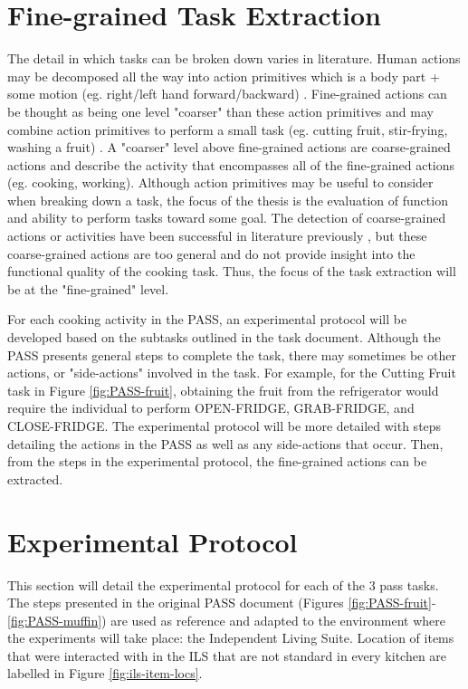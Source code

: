 \clearpage
\section{Fine-grained Task Extraction}
The detail in which tasks can be broken down varies in literature. Human actions may be decomposed all the way into action primitives which is a body part + some motion (eg. right/left hand forward/backward) \cite{huszHumanActivityRecognition2007}. Fine-grained actions can be thought as being one level "coarser" than these action primitives and may combine action primitives to perform a small task (eg. cutting fruit, stir-frying, washing a fruit)  \cite{pan_fine-grained_2020}. A "coarser" level above fine-grained actions are coarse-grained actions and describe the activity that encompasses all of the fine-grained actions (eg. cooking, working). Although action primitives may be useful to consider when breaking down a task, the focus of the thesis is the evaluation of function and ability to perform tasks toward some goal. The detection of coarse-grained actions or activities have been successful in literature previously \cite{cook_learning_2010}, but these coarse-grained actions are too general and do not provide insight into the functional quality of the cooking task. Thus, the focus of the task extraction will be at the "fine-grained" level. 

For each cooking activity in the PASS, an experimental protocol will be developed based on the subtasks outlined in the task document. Although the PASS presents general steps to complete the task, there may sometimes be other actions, or "side-actions" involved in the task. For example, for the Cutting Fruit task in Figure \ref{fig:PASS-fruit}, obtaining the fruit from the refrigerator would require the individual to perform OPEN-FRIDGE, GRAB-FRIDGE, and CLOSE-FRIDGE. The experimental protocol will be more detailed with steps detailing the actions in the PASS as well as any side-actions that occur. Then, from the steps in the experimental protocol, the fine-grained actions can be extracted.

\section{Experimental Protocol}
This section will detail the experimental protocol for each of the 3 pass tasks. The steps presented in the original PASS document (Figures \ref{fig:PASS-fruit}-\ref{fig:PASS-muffin}) are used as reference and adapted to the environment where the experiments will take place: the Independent Living Suite. Location of items that were interacted with in the ILS that are not standard in every kitchen are labelled in Figure \ref{fig:ils-item-locs}.

